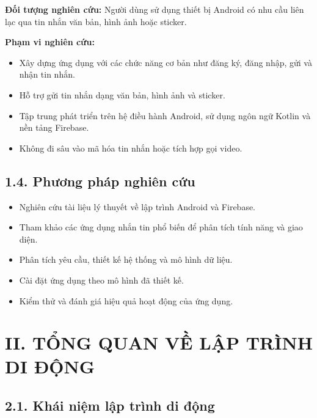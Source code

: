 \documentclass[12pt,a4paper]{article}
\begin{document}
	\noindent\textbf{Đối tượng nghiên cứu:} Người dùng sử dụng thiết bị Android có nhu cầu liên lạc qua tin nhắn văn bản, hình ảnh hoặc sticker.
	
	\vspace{0.2cm}
	
	\noindent\textbf{Phạm vi nghiên cứu:}
	\begin{itemize}
		\item Xây dựng ứng dụng với các chức năng cơ bản như đăng ký, đăng nhập, gửi và nhận tin nhắn.
		\item Hỗ trợ gửi tin nhắn dạng văn bản, hình ảnh và sticker.
		\item Tập trung phát triển trên hệ điều hành Android, sử dụng ngôn ngữ Kotlin và nền tảng Firebase.
		\item Không đi sâu vào mã hóa tin nhắn hoặc tích hợp gọi video.
	\end{itemize}
	
	\vspace{0.7cm}
	
	\subsection*{1.4. Phương pháp nghiên cứu}
	\vspace{0.1cm}
	
	\begin{itemize}
		\item Nghiên cứu tài liệu lý thuyết về lập trình Android và Firebase.
		\item Tham khảo các ứng dụng nhắn tin phổ biến để phân tích tính năng và giao diện.
		\item Phân tích yêu cầu, thiết kế hệ thống và mô hình dữ liệu.
		\item Cài đặt ứng dụng theo mô hình đã thiết kế.
		\item Kiểm thử và đánh giá hiệu quả hoạt động của ứng dụng.
	\end{itemize}
	\vspace{0.5cm}
	
	\section*{II. TỔNG QUAN VỀ LẬP TRÌNH DI ĐỘNG}
	\vspace{0.5cm}
	
	\subsection*{2.1. Khái niệm lập trình di động}
	\vspace{0.1cm}
	
\end{document}
